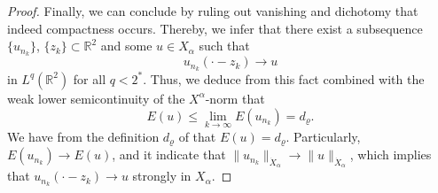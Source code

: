 \documentclass[10pt]{article}
\numberwithin{equation}{section}
\newcommand{\dz}{\;{\rm d}x{\rm d}y}
\newcommand{\xx}{{\dot{X}_\alpha}}
\newcommand{\al}{\alpha}
\newcommand{\rt}{{\mathbb{R}^2}}
\begin{document}
\begin{proof}
		Finally,   we can conclude by ruling out vanishing and dichotomy that indeed compactness occurs. Thereby, we infer 
		that there exist a subsequence $\{u_{n_k}\}$, $\{z_k\}\subset\rt$ and some $u\in X_\al$ such that
		\[
		u_{n_k}(\cdot-z_k)\to u
		\]
		in $L^q(\rt)$ for all $q<2^\ast$. Thus, we deduce from this fact combined with the weak lower semicontinuity of the $X^\al$-norm that
		\[
		E(u)\leq\lim_{k\to\infty}E(u_{n_k})=d_\varrho.
		\]
		We have from the definition $d_\varrho$ of that  $E(u) =d_\varrho$. Particularly, $E(u_{n_k})\to E(u)$, and it indicate that $\|u_{n_k}\|_\xx\to\|u\|_\xx$, which implies that $u_{n_k}(\cdot-z_k)\to u$
		strongly in $X_\al$.
		

\end{proof}
\end{document}
